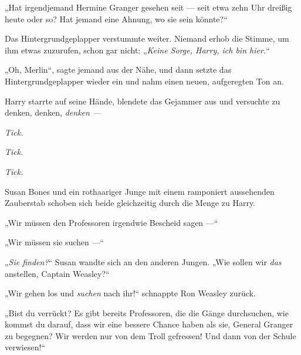 „Hat irgendjemand Hermine Granger gesehen seit — seit etwa zehn Uhr dreißig heute oder so? Hat jemand eine Ahnung, wo sie sein könnte?“


Das Hintergrundgeplapper verstummte weiter. Niemand erhob die Stimme, um ihm etwas zuzurufen, schon gar nicht:
„\emph{Keine Sorge, Harry, ich bin hier.}“

„Oh, Merlin“, sagte jemand aus der Nähe, und dann setzte das Hintergrundgeplapper wieder ein und nahm einen neuen, aufgeregten Ton an.

Harry starrte auf seine Hände, blendete das Gejammer aus und versuchte zu denken, denken, \emph{denken —}

\emph{Tick.}

\emph{Tick.}

\emph{Tick.}

Susan Bones und ein rothaariger Junge mit einem ramponiert aussehenden Zauberstab schoben sich beide gleichzeitig durch die Menge zu Harry.

„Wir müssen den Professoren irgendwie Bescheid sagen —“

„Wir müssen sie suchen —“

„\emph{Sie finden?}“ Susan wandte sich an den anderen Jungen.
„Wie sollen wir \emph{das} anstellen, Captain Weasley?“

„Wir gehen los und \emph{suchen} nach ihr!“ schnappte Ron Weasley zurück.

„Bist du verrückt? Es gibt bereits Professoren, die die Gänge durchsuchen, wie kommst du darauf, dass wir eine bessere Chance haben als sie, General Granger zu begegnen? Wir werden nur von dem Troll gefressen! Und dann von der Schule verwiesen!“

